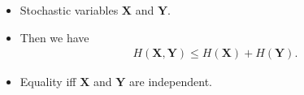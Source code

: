 \documentclass{beamer}
\let\stoch\mathbf{}
\begin{document}
%
%

\begin{frame}
  \begin{lemma}
    \begin{itemize}
      \item Stochastic variables \(\stoch X\) and \(\stoch Y\).
      \item Then we have
        \begin{align*}
          H(\stoch X, \stoch Y)\leq H(\stoch X) + H(\stoch Y).
        \end{align*}
      \item Equality iff \(\stoch X\) and \(\stoch Y\) are independent.
    \end{itemize}
  \end{lemma}
\end{frame}

%
%
\end{document}
